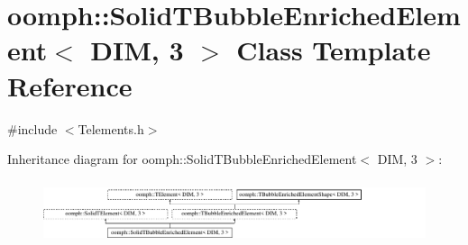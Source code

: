 \hypertarget{classoomph_1_1SolidTBubbleEnrichedElement_3_01DIM_00_013_01_4}{}\section{oomph\+:\+:Solid\+T\+Bubble\+Enriched\+Element$<$ D\+IM, 3 $>$ Class Template Reference}
\label{classoomph_1_1SolidTBubbleEnrichedElement_3_01DIM_00_013_01_4}


{\ttfamily \#include $<$Telements.\+h$>$}

Inheritance diagram for oomph\+:\+:Solid\+T\+Bubble\+Enriched\+Element$<$ D\+IM, 3 $>$\+:\begin{figure}[H]
\begin{center}
\leavevmode
\includegraphics[height=1.848185cm]{classoomph_1_1SolidTBubbleEnrichedElement_3_01DIM_00_013_01_4}
\end{center}
\end{figure}
